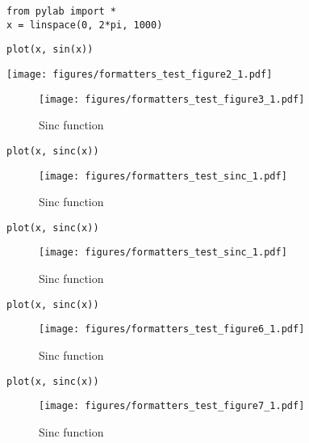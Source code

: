 

\begin{verbatim}
from pylab import *
x = linspace(0, 2*pi, 1000)
\end{verbatim}



\begin{verbatim}
plot(x, sin(x))
\end{verbatim}
\texttt{[image: figures/formatters\_test\_figure2\_1.pdf]}



\begin{figure}[htpb]
\center
\texttt{[image: figures/formatters\_test\_figure3\_1.pdf]}
\caption{Sinc function}
\label{fig:None}
\end{figure}



\begin{verbatim}
plot(x, sinc(x))
\end{verbatim}
\begin{figure}[htpb]
\center
\texttt{[image: figures/formatters\_test\_sinc\_1.pdf]}
\caption{Sinc function}
\label{fig:sinc}
\end{figure}



\begin{verbatim}
plot(x, sinc(x))
\end{verbatim}
\begin{figure}[htpb]
\center
\texttt{[image: figures/formatters\_test\_sinc\_1.pdf]}
\caption{Sinc function}
\label{fig:sinc}
\end{figure}



\begin{verbatim}
plot(x, sinc(x))
\end{verbatim}
\begin{figure}[htpb]
\center
\texttt{[image: figures/formatters\_test\_figure6\_1.pdf]}
\caption{Sinc function}
\label{fig:None}
\end{figure}



\begin{verbatim}
plot(x, sinc(x))
\end{verbatim}
\begin{sidefigure}
\begin{figure}[htpb]
\center
\texttt{[image: figures/formatters\_test\_figure7\_1.pdf]}
\caption{Sinc function}
\label{fig:None}
\end{figure}
\end{sidefigure}



